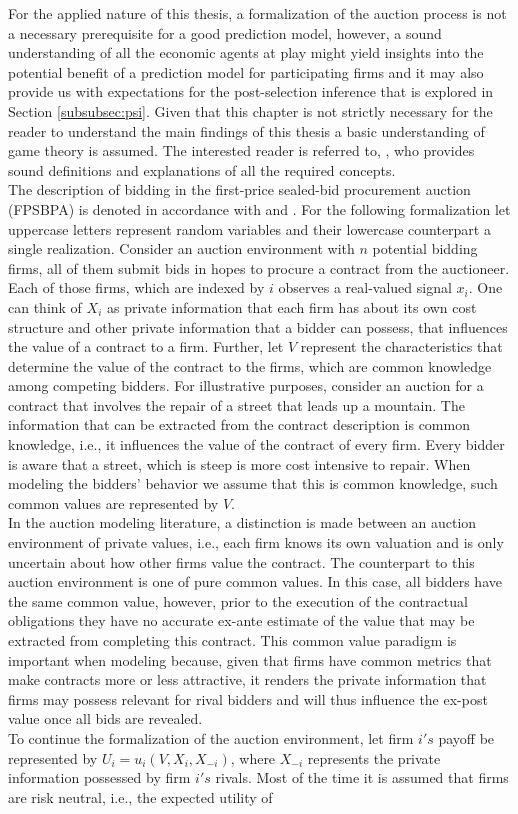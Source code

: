 \documentclass[a4paper,12pt, headsepline]{scrartcl}
\numberwithin{equation}{section}
\begin{document}
For the applied nature of this thesis, a formalization of the auction process is not a necessary prerequisite 
for a good prediction model, however, a sound understanding of all the economic agents at play might yield insights into the potential benefit of a prediction model for participating firms and it may also provide us with expectations for the post-selection inference that is explored in Section \ref{subsubsec:psi}. Given that this chapter is not strictly necessary for the reader to understand the main findings of this thesis a basic understanding of game theory is assumed. The interested reader is referred to, \citet{tadelis12}, who provides sound definitions and explanations of all the required concepts.\\
The description of bidding in the first-price sealed-bid procurement auction (FPSBPA) is denoted in accordance with \citet{milgrom82} and \citet{HandbookIndustrialOrga}. For the following formalization let uppercase letters represent random variables and their lowercase counterpart a single realization. Consider an auction environment with $n$ potential bidding firms, all of them submit bids in hopes to procure a contract from the auctioneer. Each of those firms, which are indexed by $i$ observes a real-valued signal $x_i$. One can think of $X_i$ as private information that each firm has about its own cost structure and other private information that a bidder can possess, that influences the value of a contract to a firm. Further, let $V$ represent the characteristics that determine the value of the contract to the firms, which are common knowledge among competing bidders. For illustrative purposes, consider an auction for a contract that involves the repair of a street that leads up a mountain. The information that can be extracted from the contract description is common knowledge, i.e., it influences the value of the contract of every firm. Every bidder is aware that a street, which is steep is more cost intensive to repair. When modeling the bidders' behavior we assume that this is common knowledge, such common values are represented by $V$.\\ In the auction modeling literature, a distinction is made between an auction environment of private values, i.e., each firm knows its own valuation and is only uncertain about how other firms value the contract. The counterpart to this auction environment is one of pure common values. In this case, all bidders have the same common value, however, prior to the execution of the contractual obligations they have no accurate ex-ante estimate of the value that may be extracted from completing this contract. This common value paradigm is important when modeling because, given that firms have common metrics that make contracts more or less attractive, it renders the private information that firms may possess relevant for rival bidders and will thus influence the ex-post value once all bids are revealed.\\ To continue the formalization of the auction environment, let firm $i's$ payoff be represented by $U_i = u_i(V, X_i, X_{-i})$, where $X_{-i}$ represents the private information possessed by firm $i's$ rivals. Most of the time it is assumed that firms are risk neutral, i.e., the expected utility of 
\end{document}
